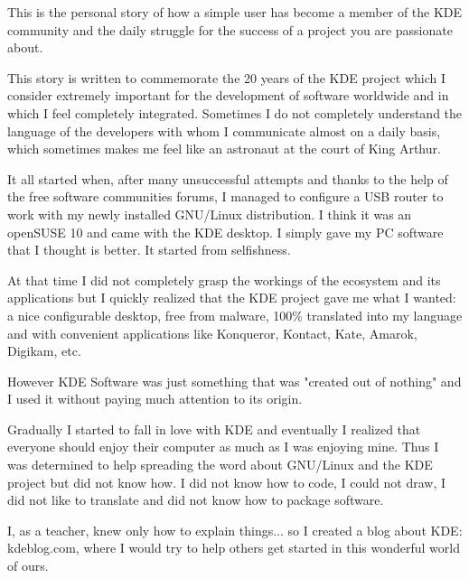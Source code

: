 

\noindent{}This is the personal story of how a simple user has become a member of the KDE community and the daily struggle for the success of a project you are passionate about.

This story is written to commemorate the 20 years of the KDE project which I consider extremely important for the development of software worldwide and in which I feel completely integrated. Sometimes I do not completely understand the language of the developers with whom I communicate almost on a daily basis, which sometimes makes me feel like an astronaut at the court of King Arthur.

It all started when, after many unsuccessful attempts and thanks to the help of the free software communities forums, I managed to configure a USB router to work with my newly installed GNU/Linux distribution. I think it was an openSUSE 10 and came with the KDE desktop. I simply gave my PC software that I thought is better. It started from selfishness.

At that time I did not completely grasp the workings of the ecosystem and its applications but I quickly realized that the KDE project gave me what I wanted: a nice configurable desktop, free from malware, 100\% translated into my language and with convenient applications like Konqueror, Kontact, Kate, Amarok, Digikam, etc.

However KDE Software was just something that was "created out of nothing" and I used it without paying much attention to its origin.

Gradually I started to fall in love with KDE and eventually I realized that everyone should enjoy their computer as much as I was enjoying mine.
Thus I was determined to help spreading the word about GNU/Linux and the KDE project but did not know how. I did not know how to code, I could not draw, I did not like to translate and did not know how to package software.

I, as a teacher, knew only how to explain things... so I created a blog about KDE: kdeblog.com, where I would try to help others get started in this wonderful world of ours.

